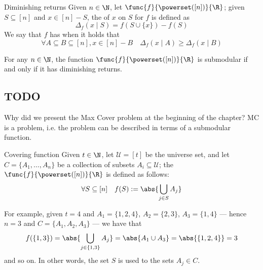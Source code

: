 \documentclass[a4paper, 12pt]{report}
\begin{document}
    \begin{frameddefn}{Diminishing returns}
        Given $n \in \N$, let $\func{f}{\powerset([n])}{\R}$; given $S \subseteq [n]$ and $x \in [n] - S$, the  of $x$ on $S$ for $f$ is defined as $$\Delta_f(x \mid S) = f(S \cup \{x\}) - f(S)$$ We say that $f$ has  when it holds that $$\forall A \subseteq B \subseteq [n], x \in [n] - B \quad \Delta_f(x \mid A) \ge \Delta_f(x \mid B)$$
    \end{frameddefn}

    \begin{framedthm}{}
        For any $n \in \N$, the function $\func{f}{\powerset([n])}{\R}$ is submodular if and only if it has diminishing returns.
    \end{framedthm}


    \subsection{TODO}

    Why did we present the Max Cover problem at the beginning of the chapter? MC is a  problem, i.e. the problem can be described in terms of a submodular function.

    \begin{frameddefn}{Covering function}
        Given $t \in \N$, let $\mathcal U = [t]$ be the universe set, and let $C = \{A_1, \ldots, A_n\}$ be a collection of subsets $A_i \subseteq \mathcal U$; the  $\func{f}{\powerset([n])}{\R}$ is defined as follows: $$\forall S \subseteq [n] \quad f(S) := \abs{\bigcup_{j \in S}{A_j}}$$
    \end{frameddefn}

    For example, given $t = 4$ and $A_1 = \{1, 2, 4\}$, $A_2 = \{2, 3\}$, $A_3 = \{1, 4\}$ --- hence $n = 3$ and $C = \{A_1, A_2, A_3\}$ --- we have that $$f(\{1, 3\}) = \abs{\bigcup_{j \in \{1, 3\}}{A_j}} = \abs{A_1 \cup A_3} = \abs{\{1, 2, 4\}} = 3$$ and so on. In other words, the set $S$ is used to  the sets $A_j \in C$.
\end{document}
